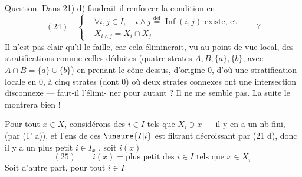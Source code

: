 \uline{Question}. Dans 21) d) faudrait il
renforcer la condition en
\[
(24)\quad\left\{\begin{aligned}
&\forall i,j\in I,\quad i\wedge j\overset{\mathrm{def}}{=}\operatorname{Inf}(i,j)\text{ existe, et}\\
&X_{i\wedge j}=X_i\cap X_j
\end{aligned}\right.\qquad ?
\]
Il n'est pas clair qu'il le faille, car
cela éliminerait, vu au point de vue local,
des stratifications comme celles déduites  
(quatre strates $A,B,\{a\},\{b\}$, avec
$A\cap B=\{a\}\cup\{b\}$) en prenant le
cône dessus,  d'origine $0$,
d'où une stratification locale en $0$, à cinq
strates (dont $0$) où deux strates connexes ont
une intersection disconnexe --- faut-il l'élimi-
ner pour autant ? Il  ne me
semble pas. La suite le montrera bien !

Pour tout $x\in X$, considérons  des $i\in I$ tels
que $X_i\ni x$ --- il y en a un nb fini, 
(par (1' a)), et l'ens de ces $\unsure{I|i}$ est filtrant
décroissant par (21 d), donc il y a
un plus petit $i\in I_x$ , soit $i(x)$
\[
(25)\qquad i(x)=\text{plus petit des }i\in I\text{ tels que }x\in X_i.
\]
Soit d'autre part, pour tout $i\in I$
